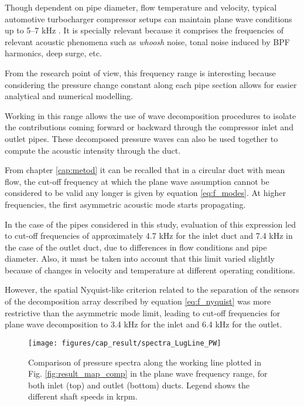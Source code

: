Though dependent on pipe diameter, flow temperature and velocity, typical automotive turbocharger compressor setups can maintain plane wave conditions up to 5--7 kHz \cite{gaude2008experimental}. It is specially relevant because it comprises the frequencies of relevant acoustic phenomena such as \emph{whoosh} noise, tonal noise induced by BPF harmonics, deep surge, etc.

From the research point of view, this frequency range is interesting because considering the pressure change constant along each pipe section allows for easier analytical and numerical modelling. 

Working in this range allows the use of wave decomposition procedures to isolate the contributions coming forward or backward through the compressor inlet and outlet pipes. These decomposed pressure waves can also be used together to compute the acoustic intensity through the duct.

From chapter \ref{cap:metod} it can be recalled that in a circular duct with mean flow, the cut-off frequency at which the plane wave assumption cannot be considered to be valid any longer is given by equation \ref{eq:f_modes}. At higher frequencies, the first asymmetric acoustic mode starts propagating.

In the case of the pipes considered in this study, evaluation of this expression led to cut-off frequencies of approximately 4.7 kHz for the inlet duct and 7.4 kHz in the case of the outlet duct, due to differences in flow conditions and pipe diameter. Also, it must be taken into account that this limit varied slightly because of changes in velocity and temperature at different operating conditions.

However, the spatial Nyquist-like criterion related to the separation of the sensors of the decomposition array described by equation \ref{eq:f_nyquist} was more restrictive than the asymmetric mode limit, leading to cut-off frequencies for plane wave decomposition to 3.4 kHz for the inlet and 6.4 kHz for the outlet.

\begin{figure}[tbh!]
\centering
\texttt{[image: figures/cap\_result/spectra\_LugLine\_PW]}
\caption{Comparison of pressure spectra along the working line plotted in Fig. \ref{fig:result_map_comp} in the plane wave frequency range, for both inlet (top) and outlet (bottom) ducts. Legend shows the different shaft speeds in krpm.}
\label{fig:result_spectra_LugLine_PW}
\end{figure}

